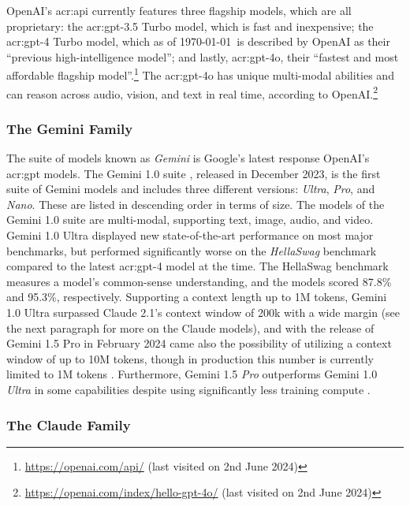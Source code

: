 OpenAI's \acrshort{acr:api} currently features three flagship models, which are all proprietary: the \acrshort{acr:gpt}-3.5 Turbo model, which is fast and inexpensive; the \acrshort{acr:gpt}-4 Turbo model, which as of \today~is described by OpenAI as their \enquote{previous high-intelligence model}; and lastly, \acrshort{acr:gpt}-4o, their \enquote{fastest and most affordable flagship model}.\footnote{\url{https://openai.com/api/} (last visited on 2nd June 2024)} The \acrshort{acr:gpt}-4o has unique multi-modal abilities and can reason across audio, vision, and text in real time, according to OpenAI.\footnote{\url{https://openai.com/index/hello-gpt-4o/} (last visited on 2nd June 2024)}

\subsubsection{The Gemini Family}
\label{subsubsec:gemini}

The suite of models known as \textit{Gemini} is Google's latest response OpenAI's \acrshort{acr:gpt} models. The Gemini 1.0 suite \citep{geminiteamGeminiFamilyHighly2024}, released in December 2023, is the first suite of Gemini models and includes three different versions: \textit{Ultra}, \textit{Pro}, and \textit{Nano}. These are listed in descending order in terms of size. The models of the Gemini 1.0 suite are multi-modal, supporting text, image, audio, and video. Gemini 1.0 Ultra displayed new state-of-the-art performance on most major benchmarks, but performed significantly worse on the \textit{HellaSwag} benchmark compared to the latest \acrshort{acr:gpt}-4 model at the time. The HellaSwag benchmark measures a model's common-sense understanding, and the models scored 87.8\% and 95.3\%, respectively. Supporting a context length up to 1M tokens, Gemini 1.0 Ultra surpassed Claude 2.1's context window of 200k with a wide margin (see the next paragraph for more on the Claude models), and with the release of Gemini 1.5 Pro in February 2024 came also the possibility of utilizing a context window of up to 10M tokens, though in production this number is currently limited to 1M tokens \citep{geminiteamGeminiUnlockingMultimodal2024, pichaiOurNextgenerationModel2024}. Furthermore, Gemini 1.5 \textit{Pro} outperforms Gemini 1.0 \textit{Ultra} in some capabilities despite using significantly less training compute \citep[31]{geminiteamGeminiUnlockingMultimodal2024}.

\subsubsection{The Claude Family}
\label{subsubsec:claude}

